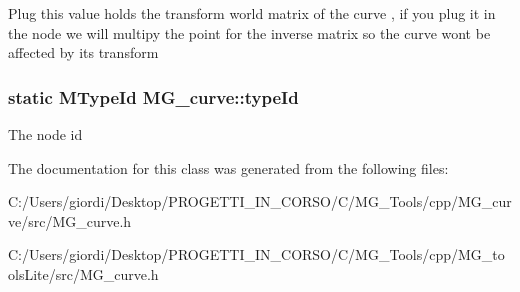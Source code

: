 Plug this value holds the transform world matrix of the curve , if you plug it in the node we will multipy the point for the inverse matrix so the curve wont be affected by its transform \hypertarget{class_m_g__curve_aaefd29164297e9889c41608b8b7f2542}{
\subsubsection[{type\-Id}]{\setlength{\rightskip}{0pt plus 5cm}static M\-Type\-Id M\-G\-\_\-curve\-::type\-Id\hspace{0.3cm}{\ttfamily [static]}}}\label{class_m_g__curve_aaefd29164297e9889c41608b8b7f2542}
The node id 

The documentation for this class was generated from the following files\-:\begin{DoxyCompactItemize}
\item 
C\-:/\-Users/giordi/\-Desktop/\-P\-R\-O\-G\-E\-T\-T\-I\-\_\-\-I\-N\-\_\-\-C\-O\-R\-S\-O/\-C/\-M\-G\-\_\-\-Tools/cpp/\-M\-G\-\_\-curve/src/M\-G\-\_\-curve.\-h\item 
C\-:/\-Users/giordi/\-Desktop/\-P\-R\-O\-G\-E\-T\-T\-I\-\_\-\-I\-N\-\_\-\-C\-O\-R\-S\-O/\-C/\-M\-G\-\_\-\-Tools/cpp/\-M\-G\-\_\-tools\-Lite/src/M\-G\-\_\-curve.\-h\end{DoxyCompactItemize}
